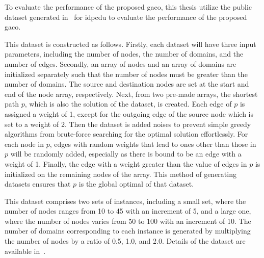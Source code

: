 To evaluate the performance of the proposed \acrshort{gaco}, 
this thesis utilize the public dataset generated in~\cite{binh2020multifactorial} for \gls{idpcdu} to evaluate the performance of the proposed \acrshort{gaco}. 

This dataset is constructed as follows. Firstly, each dataset will have three input parameters, including the number of nodes, the number of domains, and the number of edges. Secondly, an array of nodes and an array of domains are initialized separately such that the number of nodes must be greater than the number of domains. The source and destination nodes are set at the start and end of the node array, respectively. Next, from two pre-made arrays, the shortest path $p$, which is also the solution of the dataset, is created. Each edge of $p$ is assigned a weight of 1, except for the outgoing edge of the source node which is set to a weight of 2. Then the dataset is added noises to prevent simple greedy algorithms from brute-force searching for the optimal solution effortlessly. For each node in $p$, edges with random weights that lead to ones other than those in $p$ will be randomly added, especially as there is bound to be an edge with a weight of 1. Finally, the edge with a weight greater than the value of edges in $p$ is initialized on the remaining nodes of the array. This method of generating datasets ensures that $p$ is the global optimal of that dataset.

This dataset comprises two sets of instances, including a small set, where the number of nodes ranges from 10 to 45 with an increment of 5, and a large one, where the number of nodes varies from 50 to 100 with an increment of 10.
The number of domains corresponding to each instance is generated by multiplying the number of nodes by a ratio of 0.5, 1.0, and 2.0. Details of the dataset are available in~\cite{idpcdu2020data}.